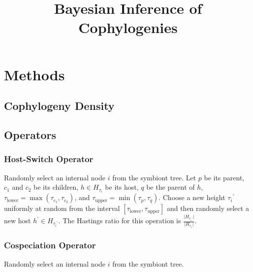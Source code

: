 \documentclass{article}
\title{Bayesian Inference of Cophylogenies}
\begin{document}
    \section*{Methods}
        
        \subsection*{Cophylogeny Density}

        \subsection*{Operators}
            
            \subsubsection*{Host-Switch Operator}
                
                Randomly select an internal node $i$ from the symbiont tree. 
                Let $p$ be its parent, $c_1$ and $c_2$ be its children, $h \in 
                H_{\tau_i}$ be its host, $q$ be the parent of $h$, 
                $\tau_\text{lower} = \max\left(\tau_{c_1},\tau_{c_2}\right)$, 
                and $\tau_\text{upper} = \min\left(\tau_p,\tau_q\right)$. 
                Choose a new height ${\tau_i}^\prime$ uniformly at random from 
                the interval $\left[\tau_\text{lower}, 
                \tau_\text{upper}\right]$ and then randomly select a new host 
                $h^\prime \in H_{{\tau_i}^\prime}$. The Hastings ratio for this 
                operation is $\frac{\lvert{H_{{\tau_i}^\prime}}\rvert}
                {\lvert{H_{\tau_i}}\rvert}$.

            \subsubsection*{Cospeciation Operator}
                
                Randomly select an internal node $i$ from the symbiont tree.
\end{document}
